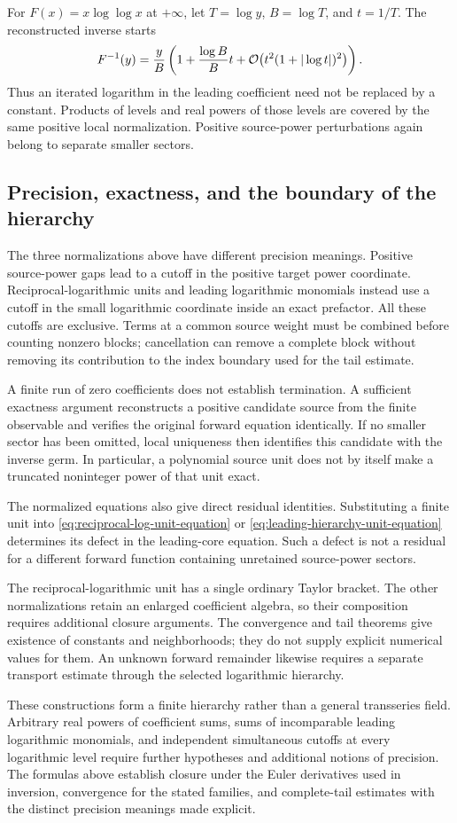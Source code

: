For $F(x)=x\log\log x$ at $+\infty$, let
$T=\log y$, $B=\log T$, and $t=1/T$. The reconstructed inverse starts
\begin{equation}
 F^{-1}(y)=\frac{y}{B}
 \left(1+\frac{\log B}{B}t
 +\mathcal O\!\left(t^2(1+|\log t|)^2\right)\right).
 \label{eq:leading-iterated-log-example}
\end{equation}
Thus an iterated logarithm in the leading coefficient need not be replaced
by a constant. Products of levels and real powers of those levels are
covered by the same positive local normalization. Positive source-power
perturbations again belong to separate smaller sectors.

\subsection{Precision, exactness, and the boundary of the hierarchy}

The three normalizations above have different precision meanings. Positive
source-power gaps lead to a cutoff in the positive target power coordinate.
Reciprocal-logarithmic units and leading logarithmic monomials instead use
a cutoff in the small logarithmic coordinate inside an exact prefactor.
All these cutoffs are exclusive. Terms at a common source weight must be
combined before counting nonzero blocks; cancellation can remove a complete
block without removing its contribution to the index boundary used for the
tail estimate.

A finite run of zero coefficients does not establish termination. A
sufficient exactness argument reconstructs a positive candidate source from
the finite observable and verifies the original forward equation identically.
If no smaller sector has been omitted, local uniqueness then identifies
this candidate with the inverse germ. In particular, a polynomial source
unit does not by itself make a truncated noninteger power of that unit exact.

The normalized equations also give direct residual identities. Substituting
a finite unit into \eqref{eq:reciprocal-log-unit-equation} or
\eqref{eq:leading-hierarchy-unit-equation} determines its defect in the
leading-core equation. Such a defect is not a residual for a different
forward function containing unretained source-power sectors.

The reciprocal-logarithmic unit has a single ordinary Taylor bracket.
The other normalizations retain an enlarged coefficient algebra, so their
composition requires additional closure arguments. The convergence and
tail theorems give existence of constants and neighborhoods; they do not
supply explicit numerical values for them. An unknown forward remainder
likewise requires a separate transport estimate through the selected
logarithmic hierarchy.

These constructions form a finite hierarchy rather than a general
transseries field. Arbitrary real powers of coefficient sums, sums of
incomparable leading logarithmic monomials, and independent simultaneous
cutoffs at every logarithmic level require further hypotheses and additional
notions of precision. The formulas above establish closure under the Euler
derivatives used in inversion, convergence for the stated families, and
complete-tail estimates with the distinct precision meanings made explicit.
